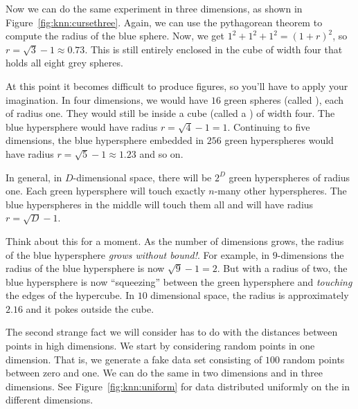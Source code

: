 
Now we can do the same experiment in three dimensions, as shown in
Figure~\ref{fig:knn:cursethree}.  Again, we can use the pythagorean
theorem to compute the radius of the blue sphere.  Now, we get $1^2 +
1^2 + 1^2 = (1+r)^2$, so $r = \sqrt3 - 1 \approx 0.73$.  This is still
entirely enclosed in the cube of width four that holds all eight grey
spheres.

At this point it becomes difficult to produce figures, so you'll have
to apply your imagination.  In four dimensions, we would have $16$
green spheres (called ), each of radius one.
They would still be inside a cube (called a ) of
width four.  The blue hypersphere would have radius $r = \sqrt4 - 1 =
1$.  Continuing to five dimensions, the blue hypersphere embedded in
$256$ green hyperspheres would have radius $r = \sqrt5-1 \approx 1.23$
and so on.

In general, in $D$-dimensional space, there will be $2^D$ green
hyperspheres of radius one.  Each green hypersphere will touch exactly
$n$-many other hyperspheres.  The blue hyperspheres in the middle will
touch them all and will have radius $r = \sqrt D - 1$.

Think about this for a moment.  As the number of dimensions grows, the
radius of the blue hypersphere \emph{grows without bound!}.  For
example, in $9$-dimensions the radius of the blue hypersphere is now
$\sqrt9-1 = 2$.  But with a radius of two, the blue hypersphere is now
``squeezing'' between the green hypersphere and \emph{touching} the
edges of the hypercube.  In $10$ dimensional space, the radius is
approximately $2.16$ and it pokes outside the cube.




The second strange fact we will consider has to do with the distances
between points in high dimensions.  We start by considering random
points in one dimension.  That is, we generate a fake data set
consisting of $100$ random points between zero and one.  We can do the
same in two dimensions and in three dimensions.  See
Figure~\ref{fig:knn:uniform} for data distributed uniformly on the
 in different dimensions.

